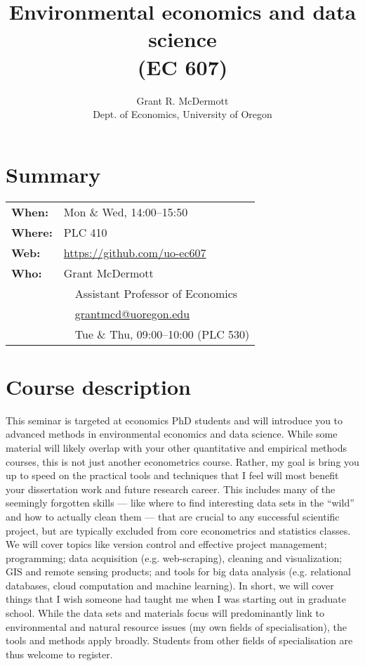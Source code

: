 \documentclass[12]{article}
\newcommand{\subtitle}[1]{%
	\posttitle{%
		\par\end{center}
	\begin{center}\large#1\end{center}
	\vskip0.5em}%
}
\begin{document}
\title{Environmental economics and data science \\(EC 607)}
\subtitle{\textsc{Winter 2019 syllabus}\vspace{-2ex}}
\author{Grant R. McDermott\\ Dept. of Economics, University of Oregon}
\date{\vspace{-5ex}}
	
\maketitle

\section*{Summary}

\begin{tabular}{ll} 
	\textbf{When:} & Mon \& Wed, 14:00--15:50 \\
	\textbf{Where:} & PLC 410 \\
	\textbf{Web:} & \href{https://github.com/uo-ec607}{https://github.com/uo-ec607} \\
	\textbf{Who:} & Grant McDermott \\
	& \, \faMortarBoard \, Assistant Professor of Economics \\
	& \, \faEnvelopeO \, \href{mailto:grantmcd@uoregon.edu}{grantmcd@uoregon.edu} \\
	& \, \faHourglassHalf \, Tue \& Thu, 09:00--10:00 (PLC 530) \\
\end{tabular} 

\section*{Course description}

This seminar is targeted at economics PhD students and will introduce you to advanced methods in environmental economics and data science. While some material will likely overlap with your other quantitative and empirical methods courses, this is not just another econometrics course. Rather, my goal is bring you up to speed on the practical tools and techniques that I feel will most benefit your dissertation work and future research career. This includes many of the seemingly forgotten skills --- like where to find interesting data sets in the ``wild'' and how to actually clean them --- that are crucial to any successful scientific project, but are typically excluded from core econometrics and statistics classes. We will cover topics like version control and effective project management; programming; data acquisition (e.g. web-scraping), cleaning and visualization; GIS and remote sensing products; and tools for big data analysis (e.g. relational databases, cloud computation and machine learning). In short, we will cover things that I wish someone had taught me when I was starting out in graduate school. While the data sets and materials focus will predominantly link to environmental and natural resource issues (my own fields of specialisation), the tools and methods apply broadly. Students from other fields of specialisation are thus welcome to register.
\end{document}
